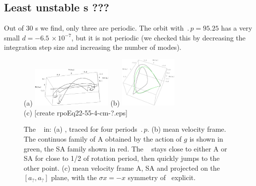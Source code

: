 %


\subsection*{Least unstable \rpo s ???}

%
Out of 30 \rpo s we
find,  only three are periodic.  The orbit
with $\period{p} = 95.25$ has a very small
$d = -6.5\,\times 10^{-7}$, but it is not periodic
(we
checked this by decreasing the integration step size and increasing the
number of modes).


\begin{figure}[t] \label{f:rpo55}
\begin{center}
(a) \includegraphics[width=0.35\textwidth]{figs/rpo22-55-4-clean.eps}
(b) \includegraphics[width=0.25\textwidth]{figs/rpoEq22-55-4-cm.eps}
\\
(c) [create rpoEq22-55-4-cm-?.eps]
\end{center}
\caption{
 The \rpo\  in:
 (a) \Statesp, traced for four periods $\period{p}$.
 (b) mean velocity frame.
        The continuos family of
    {\eqva} A obtained by the action of $g$ is shown in green,
    the SA family shown in red. The \rpo\  stays close
    to either A or SA for close to 1/2 of {\eqv} rotation
    period, then quickly jumps to the other {\eqv} point.
 (c) mean velocity frame A, SA and  projected on the
    $[a_?,a_?]$ plane,
    with the $\sigma x = -x$ symmetry of \KSe\ explicit.
        }
\end{figure}



